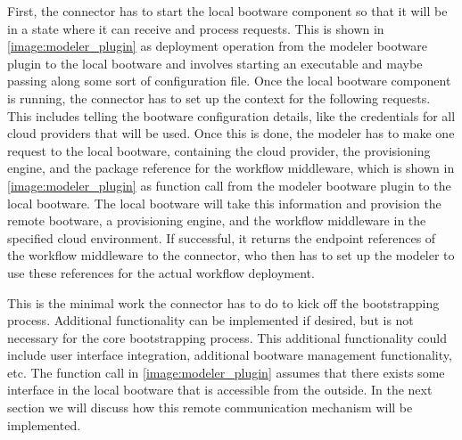 First, the connector has to start the local bootware component so that it will be in a state where it can receive and process requests.
This is shown in \autoref{image:modeler_plugin} as deployment operation from the modeler bootware plugin to the local bootware and involves starting an executable and maybe passing along some sort of configuration file.
Once the local bootware component is running, the connector has to set up the context for the following requests.
This includes telling the bootware configuration details, like the credentials for all cloud providers that will be used.
Once this is done, the modeler has to make one request to the local bootware, containing the cloud provider, the provisioning engine, and the package reference for the workflow middleware, which is shown in \autoref{image:modeler_plugin} as function call from the modeler bootware plugin to the local bootware.
The local bootware will take this information and provision the remote bootware, a provisioning engine, and the workflow middleware in the specified cloud environment.
If successful, it returns the endpoint references of the workflow middleware to the connector, who then has to set up the modeler to use these references for the actual workflow deployment.

This is the minimal work the connector has to do to kick off the bootstrapping process.
Additional functionality can be implemented if desired, but is not necessary for the core bootstrapping process.
This additional functionality could include user interface integration, additional bootware management functionality, etc.
The function call in \autoref{image:modeler_plugin} assumes that there exists some interface in the local bootware that is accessible from the outside.
In the next section we will discuss how this remote communication mechanism will be implemented.
